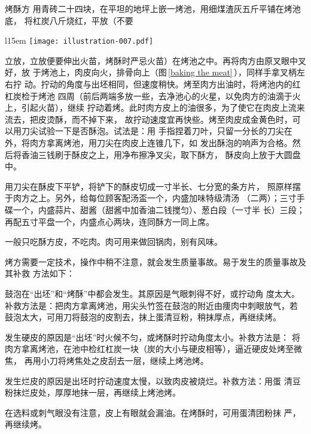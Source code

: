 \begin{recipe}{烤酥方}
\step[烤酥] 用青砖二十四块，在平坦的地坪上嵌一烤池，用细煤渣灰五斤平铺在烤池底，
将杠炭八斤烧红，平放（不要
\begin{wrapfigure}[13]{l}{15em}%
\centering%
\vspace{-.5\baselineskip}%
\texttt{[image: illustration-007.pdf]}%
\vspace{.1875\baselineskip}%
\caption{烤酥}
\label{baking the meat}
\end{wrapfigure}
%
立放，立放便要伸出火苗，烤酥时严忌火苗）在烤池之中。再将肉方由原叉眼中叉好，放
于烤池上，肉皮向火，排骨向上（图\,\ref{baking the meat}\,），同样手拿叉柄左右拧
动。拧动的角度与出坯相同，但速度稍快。烤至肉方出油时，将烤池内的红杠炭检于烤池
四周（前后两端多放一些，去净池心的火星，以免肉方的油滴于火上，引起火苗），继续
拧动着烤。此时肉方皮上的油很多，为了使它在肉皮上流来流去，把皮烫酥，而不掉下来，
故拧动速度宜再快些。烤至肉皮成金黄色时，可以用刀尖试验一下是否酥泡。试法是：用
手指捏着刀叶，只留一分长的刀尖在外，将肉方拿离烤池，用刀尖在肉皮上连锥几下，如
发出酥泡的响声为合格。然后将香油三钱刷于酥皮之上，用净布擦净叉尖，取下酥方，
酥皮向上放于大圆盘中。

\step[铲皮上席] 用刀尖在酥皮下平铲，将铲下的酥皮切成一寸半长、七分宽的条方片，
照原样摆于肉方之上。另外，给每位顾客配汤盃一个，内盛加味特级清汤\footnotemark
（二两）；三寸手碟一个，内盛蒜片、甜酱（甜酱中加香油二钱搅匀）、葱白段（一寸半
长）三段；再配五寸平盘一个，内盛点心两块，连同酥方一同上席。

\step[吃法] 一般只吃酥方皮，不吃肉。肉可用来做回锅肉，别有风味。

\suggestion

烤方需要一定技术，操作中稍不注意，就会发生质量事故。易于发生的质量事故及其补救
方法如下：

\hint[方皮鼓泡] 鼓泡在“出坯”和“烤酥”中都会发生。其原因是气眼刺得不好，或拧动角
度太大。补救方法是：把肉方拿离烤池，用尖头竹签在鼓泡的附近由痩肉中刺眼放气，若
鼓泡太大，可用刀将鼓泡的皮割去，抹上蛋清豆粉，稍抹厚点，再继续烤。

\hint[硬皮] 发生硬皮的原因是“出坯”时火候不匀，或烤酥时拧动角度太小。补救方法是：
将肉方拿离烤池，在池中检红杠炭一块（炭的大小与硬皮相等），逼近硬皮处烤至微焦，
再用小刀将烤焦处之皮刮去一层，继续上烤池烤。

\hint[烂皮] 发生烂皮的原因是出坯时拧动速度太慢，以致肉皮被烧烂。补救方法：用蛋
清豆粉抹烂皮处，厚厚地抹一层，再继续上烤池烤。

\hint[漏油] 在选料或刺气眼没有注意，皮上有眼就会漏油。在烤酥时，可用蛋清团粉抹
严，再继续烤。


\end{recipe}
